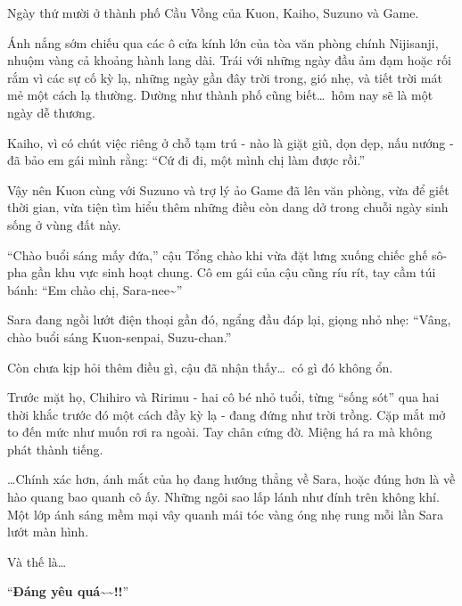 \documentclass[../main.tex]{subfiles}
\begin{document}

Ngày thứ mười ở thành phố Cầu Vồng của Kuon, Kaiho, Suzuno và Game.

Ánh nắng sớm chiếu qua các ô cửa kính lớn của tòa văn phòng chính Nijisanji, nhuộm vàng cả khoảng hành lang dài. Trái với những ngày đầu ảm đạm hoặc rối rắm vì các sự cố kỳ lạ, những ngày gần đây trời trong, gió nhẹ, và tiết trời mát mẻ một cách lạ thường. Dường như thành phố cũng biết\dots\ hôm nay sẽ là một ngày dễ thương.

Kaiho, vì có chút việc riêng ở chỗ tạm trú - nào là giặt giũ, dọn dẹp, nấu nướng - đã bảo em gái mình rằng: ``Cứ đi đi, một mình chị làm được rồi.''

Vậy nên Kuon cùng với Suzuno và trợ lý ảo Game đã lên văn phòng, vừa để giết thời gian, vừa tiện tìm hiểu thêm những điều còn dang dở trong chuỗi ngày sinh sống ở vùng đất này.

``Chào buổi sáng mấy đứa,'' cậu Tổng chào khi vừa đặt lưng xuống chiếc ghế sô-pha gần khu vực sinh hoạt chung. Cô em gái của cậu cũng ríu rít, tay cầm túi bánh: ``Em chào chị, Sara-nee\~{}''

Sara đang ngồi lướt điện thoại gần đó, ngẩng đầu đáp lại, giọng nhỏ nhẹ: ``Vâng, chào buổi sáng Kuon-senpai, Suzu-chan.''

Còn chưa kịp hỏi thêm điều gì, cậu đã nhận thấy\dots\ có gì đó không ổn.

Trước mặt họ, Chihiro và Ririmu - hai cô bé nhỏ tuổi, từng ``sống sót'' qua hai thời khắc trước đó một cách đầy kỳ lạ - đang đứng như trời trồng. Cặp mắt mở to đến mức như muốn rơi ra ngoài. Tay chân cứng đờ. Miệng há ra mà không phát thành tiếng.

\dots Chính xác hơn, ánh mắt của họ đang hướng thẳng về Sara, hoặc đúng hơn là về hào quang bao quanh cô ấy. Những ngôi sao lấp lánh như đính trên không khí. Một lớp ánh sáng mềm mại vây quanh mái tóc vàng óng nhẹ rung mỗi lần Sara lướt màn hình.


Và thế là\dots

``\textbf{Đáng yêu quá\~{}\~{}!!}''
\end{document}
